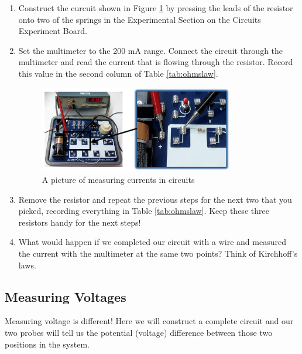\begin{enumerate}
	\item Construct the curcuit shown in Figure \ref{fig:currentpic} by pressing the leads of the resistor onto two of the springs in the Experimental Section on the Circuits Experiment Board.

	\item Set the multimeter to the 200 mA range. Connect the circuit through the multimeter and read the current that is flowing through the resistor. Record this value in the second column of Table \ref{tab:ohmslaw}.

	\begin{figure}[h]
	\centering
	\includegraphics[width=0.8\textwidth]{./Exp2/pic/currentpic.png}
	\caption{A picture of measuring currents in circuits}
	\label{fig:currentpic}
	\end{figure}

	\item Remove the resistor and repeat the previous steps for the next two that you picked, recording everything in Table \ref{tab:ohmslaw}. Keep these three resistors handy for the next steps!

	\item What would happen if we completed our circuit with a wire and measured the current with the multimeter at the same two points? Think of Kirchhoff's laws.

\end{enumerate}

\subsection{Measuring Voltages}
Measuring voltage is different! Here we will construct a complete circuit and our two probes will tell us the potential (voltage) difference between those two positions in the system.\myskip

